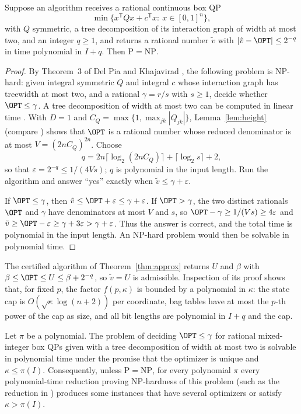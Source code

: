 \begin{proposition}
\label{prop:lc-necessity}
Suppose an algorithm receives a rational continuous box QP
\[
\min\{x^{\mathsf T}Qx+c^{\mathsf T}x:\ x\in[0,1]^n\},
\]
with $Q$ symmetric, a tree decomposition of its interaction graph of width
at most two, and an integer $q\ge1$, and returns a rational number
$\tilde v$ with $|\tilde v-\OPT|\le2^{-q}$ in time polynomial in $I+q$.
Then $\mathrm P=\mathrm{NP}$.
\end{proposition}

\begin{proof}
By Theorem~3 of Del Pia and Khajavirad \cite{DelPiaKhajavirad2026}, the
following problem is NP-hard: given integral symmetric $Q$ and integral $c$
whose interaction graph has treewidth at most two, and a rational
$\gamma=r/s$ with $s\ge1$, decide whether $\OPT\le\gamma$. A tree
decomposition of width at most two can be computed in linear time
\cite{Bodlaender1996}. With $D=1$ and $C_Q=\max\{1,\max_{jk}|Q_{jk}|\}$,
Lemma~\ref{lem:height} (compare \cite{Vavasis1990}) shows that $\OPT$ is a
rational number whose reduced denominator is at most
$V=(2nC_Q)^{2n}$. Choose
\[
q=2n\lceil\log_2(2nC_Q)\rceil+\lceil\log_2s\rceil+2,
\]
so that $\varepsilon=2^{-q}\le1/(4Vs)$; $q$ is polynomial in the input
length. Run the algorithm and answer ``yes'' exactly when
$\tilde v\le\gamma+\varepsilon$.

If $\OPT\le\gamma$, then $\tilde v\le\OPT+\varepsilon\le\gamma+\varepsilon$.
If $\OPT>\gamma$, the two distinct rationals $\OPT$ and $\gamma$ have
denominators at most $V$ and $s$, so $\OPT-\gamma\ge1/(Vs)\ge4\varepsilon$
and $\tilde v\ge\OPT-\varepsilon\ge\gamma+3\varepsilon>\gamma+\varepsilon$.
Thus the answer is correct, and the total time is polynomial in the input
length. An NP-hard problem would then be solvable in polynomial time.
\end{proof}

The certified algorithm of Theorem~\ref{thm:approx} returns $U$ and $\beta$
with $\beta\le\OPT\le U\le\beta+2^{-q}$, so $\tilde v=U$ is admissible.
Inspection of its proof shows that, for fixed $p$, the factor $f(p,\kappa)$
is bounded by a polynomial in $\kappa$: the state cap is
$O(\sqrt\kappa\log(n+2))$ per coordinate, bag tables have at most the
$p$-th power of the cap as size, and all bit lengths are polynomial in $I+q$
and the cap.

\begin{corollary}
\label{cor:lc-illconditioned}
Let $\pi$ be a polynomial. The problem of deciding $\OPT\le\gamma$ for
rational mixed-integer box QPs given with a tree decomposition of width at
most two is solvable in polynomial time under the promise that the
optimizer is unique and $\kappa\le\pi(I)$. Consequently, unless
$\mathrm P=\mathrm{NP}$, for every polynomial $\pi$ every polynomial-time
reduction proving NP-hardness of this problem (such as the reduction in
\cite[Theorem~3]{DelPiaKhajavirad2026}) produces some instances that have
several optimizers or satisfy $\kappa>\pi(I)$.
\end{corollary}

